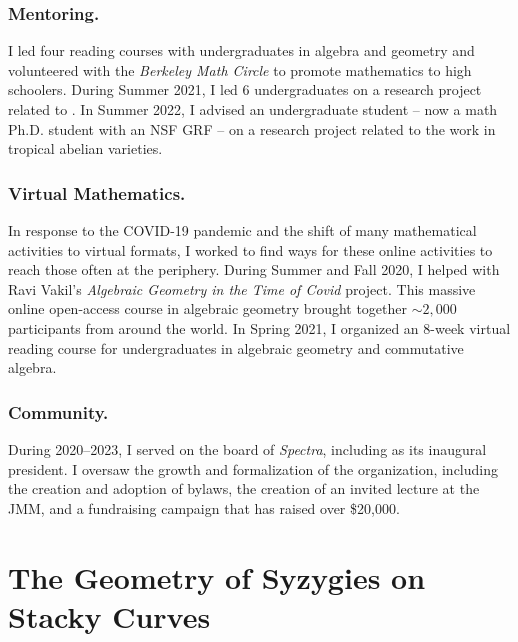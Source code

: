 \documentclass[11pt,reqno]{amsart}
\theoremstyle{remark}
\begin{document}
\subsubsection{Mentoring.} I led four reading courses with undergraduates in algebra and geometry and volunteered with the \textit{Berkeley Math Circle} to promote mathematics to high schoolers. During Summer 2021, I led 6 undergraduates on a research project related to \cite{BBCMMW24}. In Summer 2022, I advised an undergraduate student -- now a math Ph.D. student with an NSF GRF -- on a research project related to the work in tropical abelian varieties. 

\subsubsection{Virtual Mathematics.}
In response to the COVID-19 pandemic and the shift of many mathematical activities to virtual formats, I worked to find ways for these online activities to reach those often at the periphery. During Summer and Fall 2020, I helped with Ravi Vakil's \textit{Algebraic Geometry in the Time of Covid} project. This massive online open-access course in algebraic geometry brought together $\sim2,000$ participants from around the world. In Spring 2021, I organized an 8-week virtual reading course for undergraduates in algebraic geometry and commutative algebra. 

\subsubsection{Community.}  During 2020--2023, I served on the board of \textit{Spectra}, including as its inaugural president. I oversaw the growth and formalization of the organization, including the creation and adoption of bylaws, the creation of an invited lecture at the JMM, and a fundraising campaign that has raised over \$20,000.

\section{The Geometry of Syzygies on Stacky Curves}\label{sec:syzygies-on-stacks}
\end{document}
